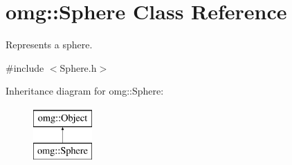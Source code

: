 \hypertarget{classomg_1_1_sphere}{}\section{omg\+::Sphere Class Reference}
\label{classomg_1_1_sphere}


Represents a sphere.  




{\ttfamily \#include $<$Sphere.\+h$>$}

Inheritance diagram for omg\+::Sphere\+:\begin{figure}[H]
\begin{center}
\leavevmode
\includegraphics[height=2.000000cm]{classomg_1_1_sphere}
\end{center}
\end{figure}
